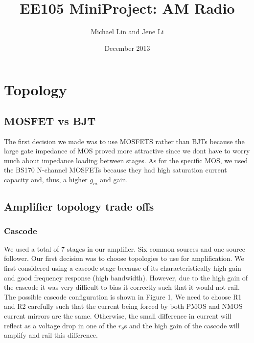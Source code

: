 \documentclass[11pt, twoside, letterpaper]{article}
\title{EE105 MiniProject: AM Radio}
\author{Michael Lin and Jene Li}
\date{December 2013}
\begin{document}
\maketitle

\section{Topology}
\subsection{MOSFET vs BJT}

The first decision we made was to use MOSFETS rather than BJTs because the large gate impedance of MOS proved more attractive since we dont have to
worry much about impedance loading between stages. As for the specific MOS, we used the BS170 N-channel MOSFETs because they had high saturation
current capacity and, thus, a higher $g_m$ and gain.

\subsection{Amplifier topology trade offs}

\subsubsection{Cascode}
We used a total of 7 stages in our amplifier. Six common sources and one source follower.
Our first decision was to choose topologies to use for amplification. We first considered using a cascode stage because of 
its characteristically high gain and good frequency response (high bandwidth). However, due to the high gain of the cascode
it was very difficult to bias it correctly such that it would not rail. The possible cascode configuration is shown in Figure 1,
We need to choose R1 and R2 carefully such that the current being forced by both PMOS and NMOS current mirrors are the same.
Otherwise, the small difference in current will reflect as a voltage drop in one of the $r_o$s and the high gain of the cascode
will amplify and rail this difference.
\end{document}
